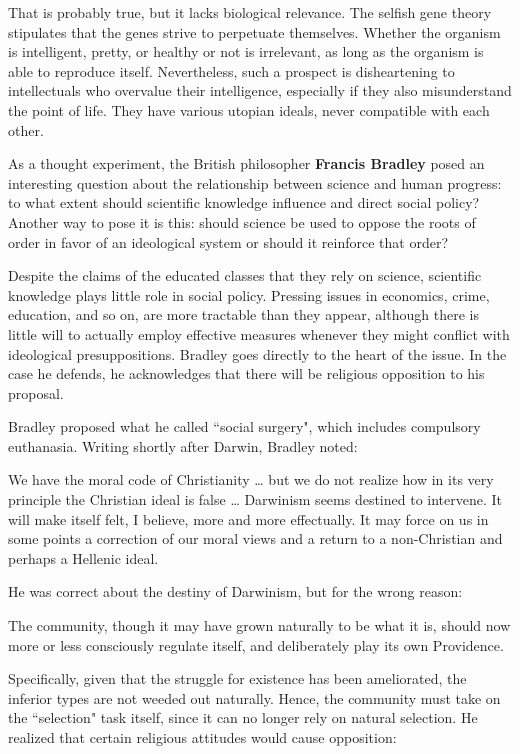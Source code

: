 That is probably true, but it lacks biological relevance. The selfish gene theory stipulates that the genes strive to perpetuate themselves. Whether the organism is intelligent, pretty, or healthy or not is irrelevant, as long as the organism is able to reproduce itself. Nevertheless, such a prospect is disheartening to intellectuals who overvalue their intelligence, especially if they also misunderstand the point of life. They have various utopian ideals, never compatible with each other.

As a thought experiment, the British philosopher \textbf{Francis Bradley} posed an interesting question about the relationship between science and human progress: to what extent should scientific knowledge influence and direct social policy? Another way to pose it is this: should science be used to oppose the roots of order in favor of an ideological system or should it reinforce that order?

Despite the claims of the educated classes that they rely on science, scientific knowledge plays little role in social policy. Pressing issues in economics, crime, education, and so on, are more tractable than they appear, although there is little will to actually employ effective measures whenever they might conflict with ideological presuppositions. Bradley goes directly to the heart of the issue. In the case he defends, he acknowledges that there will be religious opposition to his proposal.

Bradley proposed what he called ``social surgery", which includes compulsory euthanasia. Writing shortly after Darwin, Bradley noted:

\begin{quotex}
We have the moral code of Christianity … but we do not realize how in its very principle the Christian ideal is false … Darwinism seems destined to intervene. It will make itself felt, I believe, more and more effectually. It may force on us in some points a correction of our moral views and a return to a non-Christian and perhaps a Hellenic ideal. 

\end{quotex}
He was correct about the destiny of Darwinism, but for the wrong reason:

\begin{quotex}
The community, though it may have grown naturally to be what it is, should now more or less consciously regulate itself, and deliberately play its own Providence. 

\end{quotex}
Specifically, given that the struggle for existence has been ameliorated, the inferior types are not weeded out naturally. Hence, the community must take on the ``selection" task itself, since it can no longer rely on natural selection. He realized that certain religious attitudes would cause opposition:

